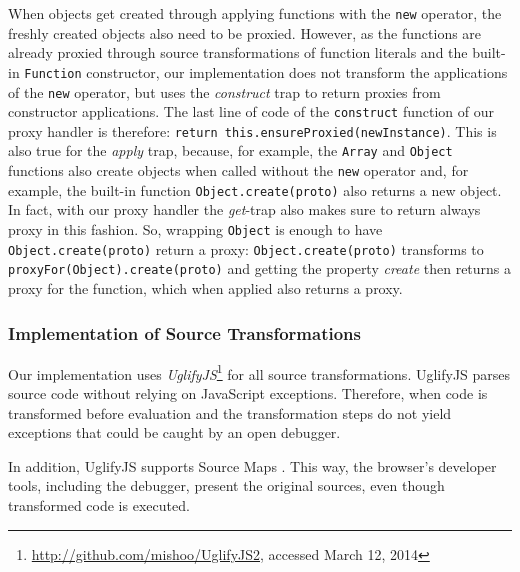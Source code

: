 When objects get created through applying functions with the \lstinline{new} operator, the freshly created objects also need to be proxied.
However, as the functions are already proxied through source transformations of function literals and the built-in \lstinline{Function} constructor, our implementation does not transform the applications of the \lstinline{new} operator, but uses the \emph{construct} trap to return proxies from constructor applications.
The last line of code of the \lstinline{construct} function of our proxy handler is therefore: \lstinline{return this.ensureProxied(newInstance)}.
This is also true for the \emph{apply} trap, because, for example, the \lstinline{Array} and \lstinline{Object} functions also create objects when called without the \lstinline{new} operator and, for example, the built-in function \lstinline{Object.create(proto)} also returns a new object.
In fact, with our proxy handler the \emph{get}-trap also makes sure to return always proxy in this fashion.
So, wrapping \lstinline{Object} is enough to have \lstinline{Object.create(proto)} return a proxy: \lstinline{Object.create(proto)} transforms to \lstinline{proxyFor(Object).create(proto)} and getting the property \emph{create} then returns a proxy for the function, which when applied also returns a proxy.



\subsubsection{Implementation of Source Transformations}


Our implementation uses \emph{UglifyJS}\footnote{\url{http://github.com/mishoo/UglifyJS2}, accessed March 12, 2014} for all source transformations.
UglifyJS parses source code without relying on JavaScript exceptions.
Therefore, when code is transformed before evaluation and the transformation steps do not yield exceptions that could be caught by an open debugger.

In addition, UglifyJS supports Source Maps .
This way, the browser's developer tools, including the debugger, present the original sources, even though transformed code is executed.


